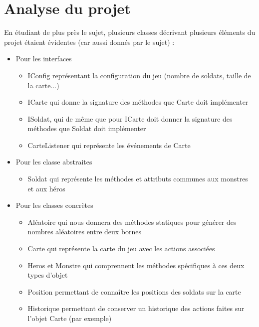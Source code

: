 \documentclass{article}
\begin{document}
\section{Analyse du projet}
En étudiant de plus près le sujet, plusieurs classes décrivant plusieurs éléments du projet étaient évidentes (car aussi donnés par le sujet) :
\begin{itemize}
  \item[\textbullet] \begin{bf}Pour les interfaces\end{bf}
        \begin{itemize}
         \item IConfig représentant la configuration du jeu (nombre de soldats, taille de la carte...)
         \item ICarte qui donne la signature des méthodes que Carte doit implémenter
         \item ISoldat, qui de même que pour ICarte doit donner la signature des méthodes que Soldat doit implémenter
         \item CarteListener qui représente les événements de Carte
        \end{itemize}
  \item[\textbullet] \begin{bf}Pour les classe abstraites\end{bf}
        \begin{itemize}
         \item Soldat qui représente les méthodes et attributs communes aux monstres et aux héros
        \end{itemize}
  \item[\textbullet] \begin{bf}Pour les classes concrètes\end{bf}
        \begin{itemize}
         \item Aléatoire qui nous donnera des méthodes statiques pour générer des nombres aléatoires entre deux bornes
         \item Carte qui représente la carte du jeu avec les actions associées
         \item Heros et Monstre qui comprennent les méthodes spécifiques à ces deux types d'objet
         \item Position permettant de connaître les positions des soldats sur la carte
	 \item Historique permettant de conserver un historique des actions faites sur l'objet Carte (par exemple)
        \end{itemize}
\end{itemize}
\end{document}
